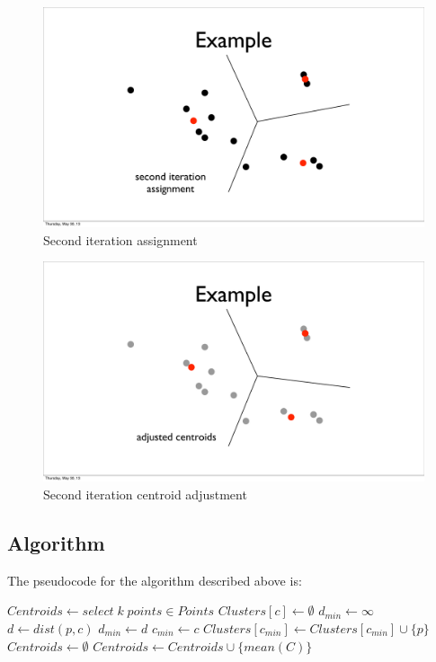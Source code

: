 \documentclass{article}
\begin{document}
\begin{figure}[H]
    \caption{Second iteration assignment}
    \includegraphics[scale=0.4]{kmeans-points-assign2.pdf}
\end{figure}

\begin{figure}[H]
    \caption{Second iteration centroid adjustment}
    \includegraphics[scale=0.4]{kmeans-points-adjust2.pdf}
\end{figure}

\pagebreak

\subsection{Algorithm}

The pseudocode for the algorithm described above is:

\begin{algorithmic}[1]
    \State $Centroids\gets select\; k\; points \in Points$
            \State $Clusters[c]\gets \emptyset$
        \EndFor
            \State $d_{min}\gets \infty$
                \State $d\gets dist(p, c)$
                    \State $d_{min}\gets d$
                    \State $c_{min} \gets c$
                \EndIf
            \EndFor
            \State $Clusters[c_{min}]\gets Clusters[c_{min}] \cup \{p\}$
        \EndFor
        \State $Centroids\gets \emptyset$
            \State $Centroids\gets Centroids \cup \{mean(C)\}$
        \EndFor
    \EndWhile
\end{algorithmic}
\end{document}

